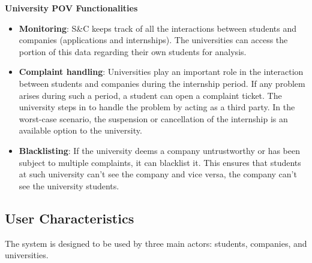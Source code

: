 \par\textbf{University POV Functionalities}

\begin{itemize}
      \item \textbf{Monitoring}: S\&C keeps track of all the interactions between students and companies (applications
            and internships). The universities can access the portion of this data regarding their own students for
            analysis.
      \item \textbf{Complaint handling}: Universities play an important role in the interaction between students and
            companies during the internship period. If any problem arises during such a period, a student can open a
            complaint ticket. The university steps in to handle the problem by acting as a third party. In the
            worst-case scenario, the suspension or cancellation of the internship is an available option to the
            university.
      \item \textbf{Blacklisting}: If the university deems a company untrustworthy or has been subject to multiple
            complaints, it can blacklist it. This ensures that students at such university can’t see the company and
            vice versa, the company can’t see the university students.
\end{itemize}

\subsection{User Characteristics}
\label{sub:user_characteristics}%

\par The system is designed to be used by three main actors: students, companies, and universities.

